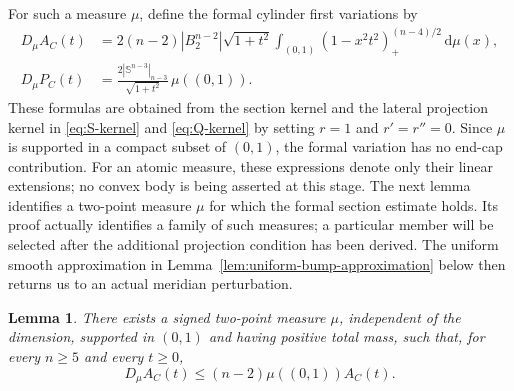 \documentclass[11pt]{article}
\newtheorem{lemma}[theorem]{Lemma}
\theoremstyle{remark}
\newcommand{\Sph}{\mathbb{S}}
\newcommand{\dd}{\,\mathrm{d}}
\newcommand{\pos}[1]{(#1)_{+}}
\begin{document}
For such a measure $\mu$, define the formal cylinder first variations by
\begin{align*}
 D_\mu A_C(t)
 &={}
 2(n-2)|B_2^{n-2}|\sqrt{1+t^2}
 \int_{(0,1)}
 \pos{1-x^2t^2}^{(n-4)/2}\dd\mu(x),\\
 D_\mu P_C(t)
 &={}
 \frac{2|\Sph^{n-3}|_{n-3}}{\sqrt{1+t^2}}\,
 \mu((0,1)).
\end{align*}
These formulas are obtained from the section kernel and the lateral
projection kernel in \eqref{eq:S-kernel} and \eqref{eq:Q-kernel} by setting
$r=1$ and $r'=r''=0$.  Since $\mu$ is supported in a compact subset of
$(0,1)$, the formal variation has no end-cap contribution.
For an atomic measure, these expressions denote only their linear extensions; no
convex body is being asserted at this stage.  The next lemma identifies a
two-point measure $\mu$ for which the formal section estimate holds.  Its proof
actually identifies a family of such measures; a particular member will be
selected after the additional projection condition has been derived.  The
uniform smooth approximation in
Lemma~\ref{lem:uniform-bump-approximation} below then returns us to an actual
meridian perturbation.


\begin{lemma}\label{lem:cylinder-section}
There exists a signed two-point measure $\mu$, independent of the
dimension, supported in $(0,1)$ and having positive total mass, such that,
for every $n\geq5$ and every $t\geq0$,
\[
 D_\mu A_C(t)\leq(n-2)\mu((0,1))A_C(t).
\]
\end{lemma}
\end{document}
